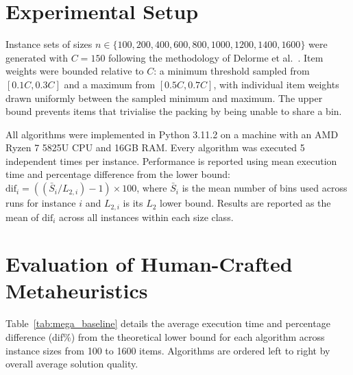 \documentclass[11pt]{article}
\begin{document}
\section{Experimental Setup} \label{sec:experimental}

Instance sets of sizes $n \in \{100, 200, 400, 600, 800, 1000, 1200, 1400, 1600\}$ were generated with $C = 150$ following the methodology of Delorme et al.\ \cite{BPPLIB}. Item weights were bounded relative to $C$: a minimum threshold sampled from $[0.1C, 0.3C]$ and a maximum from $[0.5C, 0.7C]$, with individual item weights drawn uniformly between the sampled minimum and maximum. The upper bound prevents items that trivialise the packing by being unable to share a bin.

All algorithms were implemented in Python 3.11.2 on a machine with an AMD Ryzen 7 5825U CPU and 16GB RAM. Every algorithm was executed 5 independent times per instance. Performance is reported using mean execution time and percentage difference from the lower bound: $\text{dif}_i = ((\bar{S}_i / L_{2,i}) - 1) \times 100$, where $\bar{S}_i$ is the mean number of bins used across runs for instance $i$ and $L_{2,i}$ is its $L_2$ lower bound. Results are reported as the mean of $\text{dif}_i$ across all instances within each size class.

\section{Evaluation of Human-Crafted Metaheuristics} \label{sec:human_eval}

Table~\ref{tab:mega_baseline} details the average execution time and percentage difference (dif\%) from the theoretical lower bound for each algorithm across instance sizes from 100 to 1600 items. Algorithms are ordered left to right by overall average solution quality.
\end{document}

